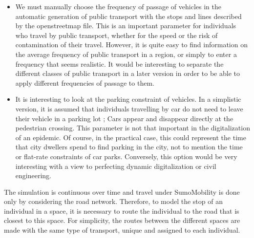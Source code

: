 \begin{itemize}

\item We must manually choose the frequency of passage of vehicles in the automatic generation of public transport with the stops and lines described by the openstreetmap file. This is an important parameter for individuals who travel by public transport, whether for the speed or the risk of contamination of their travel. However, it is quite easy to find information on the average frequency of public transport in a region, or simply to enter a frequency that seems realistic. It would be interesting to separate the different classes of public transport in a later version in order to be able to apply different frequencies of passage to them.\\

\item It is interesting to look at the parking constraint of vehicles. In a simplistic version, it is assumed that individuals travelling by car do not need to leave their vehicle in a parking lot ; Cars appear and disappear directly at the pedestrian crossing. This parameter is not that important in the  digitalization of an epidemic. Of course, in the practical case, this could represent the time that city dwellers spend to find parking in the city, not to mention the time or flat-rate constraints of car parks. Conversely, this option would be very interesting with a view to perfecting dynamic digitalization or civil engineering.\\

\end{itemize}

The simulation is continuous over time and travel under SumoMobility is done only by considering the road network. Therefore, to model the stop of an individual in a space, it is necessary to route the individual to the road that is closest to this space. For simplicity, the routes between the different spaces are made with the same type of transport, unique and assigned to each individual.\\

